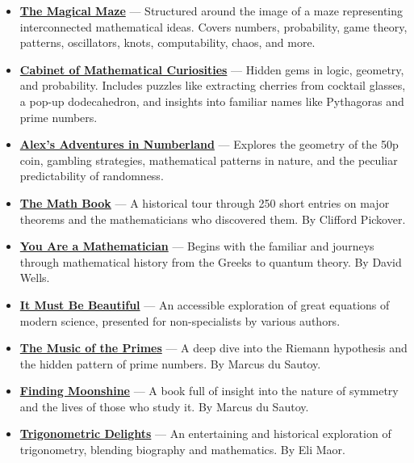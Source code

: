 \documentclass[11pt]{article}
\begin{document}
\begin{itemize}

\item \href{https://isbn.is/9780297819929}{\textbf{The Magical Maze}} — Structured around the image of a maze representing interconnected mathematical ideas. Covers numbers, probability, game theory, patterns, oscillators, knots, computability, chaos, and more.

\item \href{https://isbn.is/9781846680649}{\textbf{Cabinet of Mathematical Curiosities}} — Hidden gems in logic, geometry, and probability. Includes puzzles like extracting cherries from cocktail glasses, a pop-up dodecahedron, and insights into familiar names like Pythagoras and prime numbers.

\item \href{https://isbn.is/9780747597162}{\textbf{Alex's Adventures in Numberland}} — Explores the geometry of the 50p coin, gambling strategies, mathematical patterns in nature, and the peculiar predictability of randomness.

\item \href{https://isbn.is/9781402757969}{\textbf{The Math Book}} — A historical tour through 250 short entries on major theorems and the mathematicians who discovered them. By Clifford Pickover.

\item \href{https://isbn.is/014017480X}{\textbf{You Are a Mathematician}} — Begins with the familiar and journeys through mathematical history from the Greeks to quantum theory. By David Wells.

\item \href{https://isbn.is/1862075557}{\textbf{It Must Be Beautiful}} — An accessible exploration of great equations of modern science, presented for non-specialists by various authors.

\item \href{https://isbn.is/1841155802}{\textbf{The Music of the Primes}} — A deep dive into the Riemann hypothesis and the hidden pattern of prime numbers. By Marcus du Sautoy.

\item \href{https://isbn.is/9780007214624}{\textbf{Finding Moonshine}} — A book full of insight into the nature of symmetry and the lives of those who study it. By Marcus du Sautoy.

\item \href{https://isbn.is/0691095418}{\textbf{Trigonometric Delights}} — An entertaining and historical exploration of trigonometry, blending biography and mathematics. By Eli Maor.


\end{itemize}
\end{document}
